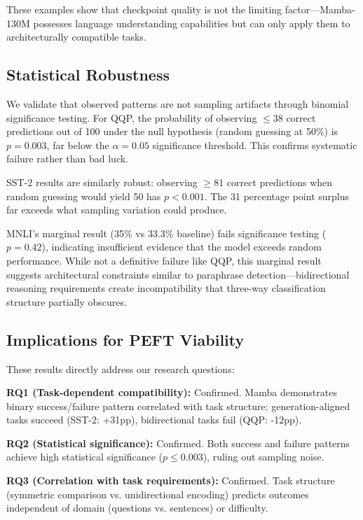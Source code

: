 These examples show that checkpoint quality is not the limiting factor---Mamba-130M possesses language understanding capabilities but can only apply them to architecturally compatible tasks.

\subsection{Statistical Robustness}

We validate that observed patterns are not sampling artifacts through binomial significance testing. For QQP, the probability of observing $\leq$38 correct predictions out of 100 under the null hypothesis (random guessing at 50\%) is $p = 0.003$, far below the $\alpha = 0.05$ significance threshold. This confirms systematic failure rather than bad luck.

SST-2 results are similarly robust: observing $\geq$81 correct predictions when random guessing would yield 50 has $p < 0.001$. The 31 percentage point surplus far exceeds what sampling variation could produce.

MNLI's marginal result (35\% vs 33.3\% baseline) fails significance testing ($p = 0.42$), indicating insufficient evidence that the model exceeds random performance. While not a definitive failure like QQP, this marginal result suggests architectural constraints similar to paraphrase detection---bidirectional reasoning requirements create incompatibility that three-way classification structure partially obscures.

\subsection{Implications for PEFT Viability}

These results directly address our research questions:

\textbf{RQ1 (Task-dependent compatibility):} Confirmed. Mamba demonstrates binary success/failure pattern correlated with task structure: generation-aligned tasks succeed (SST-2: +31pp), bidirectional tasks fail (QQP: -12pp).

\textbf{RQ2 (Statistical significance):} Confirmed. Both success and failure patterns achieve high statistical significance ($p \leq 0.003$), ruling out sampling noise.

\textbf{RQ3 (Correlation with task requirements):} Confirmed. Task structure (symmetric comparison vs. unidirectional encoding) predicts outcomes independent of domain (questions vs. sentences) or difficulty.

